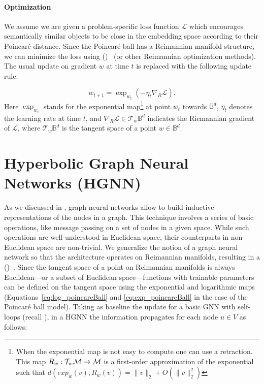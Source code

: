 \paragraph{Optimization}
We assume we are given a problem-specific loss function $\mathcal{L}$ which encourages semantically similar objects to be close in the embedding space according to their Poincaré distance. Since the Poincaré ball has a Reimannian manifold structure, we can minimize the loss using  ()~\cite{bonnabel2013RSGD} (or other Reimannian optimization methods). The usual update on gradient $w$ at time $t$ is replaced with the following update rule:

\begin{equation}
    w_{t+1} = \exp_{w_t}(-\eta_t\nabla_R\mathcal{L}).
\end{equation}
Here $\exp_{w_t}$ stands for the exponential map\footnote{When the exponential map is not easy to compute one can use a retraction. This map $R_w:\mathcal{T}_w\mathcal{M}\to\mathcal{M}$ is a first-order approximation of the exponential such that $d(exp_w(v), R_w(v))=\|v\|_2+O(\|v\|^2_2)$} at point $w_t$ towards $\mathbb{B}^d$, $\eta_t$ denotes the learning rate at time $t$, and $\nabla_R \mathcal{L} \in \mathcal{T}_{w}\mathbb{B}^d$ indicates the Riemannian gradient of $\mathcal{L}$, where $\mathcal{T}_{w}\mathbb{B}^d$ is the tangent space of a point $w \in \mathbb{B}^d$.  

\section{Hyperbolic Graph Neural Networks (HGNN)}
As we discussed in , graph neural networks allow to build inductive representations of the nodes in a graph. This technique involves a series of basic operations, like message passing on a set of nodes in a given space. While such operations are well-understood in Euclidean space, their counterparts in non-Euclidean space are non-trivial. We generalize the notion of a graph neural network so that the architecture operates on Reimannian manifolds, resulting in a ()~\cite{liu2019HGNN}. Since the tangent space of a point on Reimannian manifolds is always Euclidean---or a subset of Euclidean space---functions with trainable parameters can be defined on the tangent space using the exponential and logarithmic maps (Equations~\eqref{eq:log_poincareBall} and \eqref{eq:exp_poincareBall} in the case of the Poincaré ball model). Taking as baseline the update for a basic GNN with self-loops (recall ), in a HGNN the information propagates for each node $u \in V$ as follows:

